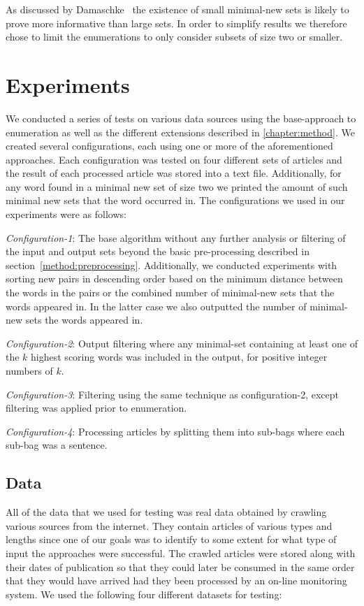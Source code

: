 As discussed by Damaschke~\cite{damaschke2015pairs} the existence of small minimal-new sets is likely to prove more informative than large sets. In order to simplify results we therefore chose to limit the enumerations to only consider subsets of size two or smaller.

\section{Experiments}
We conducted a series of tests on various data sources using the base-approach to enumeration as well as the different extensions described in \cref{chapter:method}. We created several configurations, each using one or more of the aforementioned approaches. Each configuration was tested on four different sets of articles and the result of each processed article was stored into a text file. Additionally, for any word found in a minimal new set of size two we printed the amount of such minimal new sets that the word occurred in. The configurations we used in our experiments were as follows:


\emph{Configuration-1}: The base algorithm without any further analysis or filtering of the input and output sets beyond the basic pre-processing described in section~\ref{method:preprocessing}. Additionally, we conducted experiments with sorting new pairs in descending order based on the minimum distance between the words in the pairs or the combined number of minimal-new sets that the words appeared in. In the latter case we also outputted the number of minimal-new sets the words appeared in.

\emph{Configuration-2}: Output filtering where any minimal-set containing at least one of the $k$ highest scoring words was included in the output, for positive integer numbers of $k$. 

\emph{Configuration-3}: Filtering using the same technique as configuration-2, except filtering was applied prior to enumeration.

\emph{Configuration-4}: Processing articles by splitting them into sub-bags where each sub-bag was a sentence.


\subsection{Data}
All of the data that we used for testing was real data obtained by crawling various sources from the internet. They contain articles of various types and lengths since one of our goals was to identify to some extent for what type of input the approaches were successful. The crawled articles were stored along with their dates of publication so that they could later be consumed in the same order that they would have arrived had they been processed by an on-line monitoring system. We used the following four different datasets for testing:

